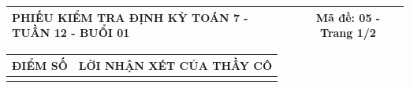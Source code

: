 \documentclass[12pt,a4paper]{article}
\begin{document}
\pagestyle{empty}
\noindent
\begin{tabularx}{\linewidth}{|X|c|}
\hline
\textbf{PHIẾU KIỂM TRA ĐỊNH KỲ TOÁN 7 - TUẦN 12 - BUỔI 01} & \textbf{Mã đề: 05 - Trang 1/2} \\
\hline
\end{tabularx}

\vspace{1.0mm}

\noindent
\begin{tabularx}{\linewidth}{|p{3.2cm}|X|}
\hline
\centering\textbf{ĐIỂM SỐ} & \centering\textbf{LỜI NHẬN XÉT CỦA THẦY CÔ} \tabularnewline
\hline
\rule{0pt}{1.8cm} & \tabularnewline
\hline
\end{tabularx}
\end{document}
